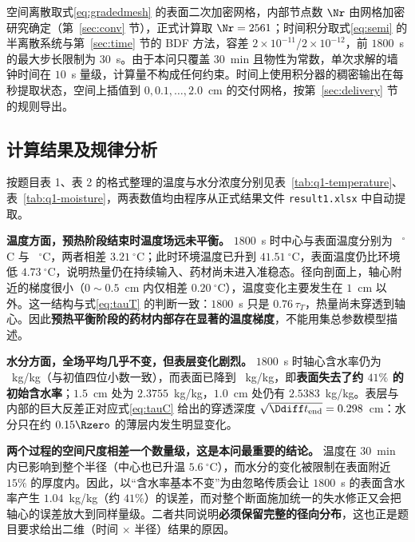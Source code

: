 空间离散取式\eqref{eq:gradedmesh} 的表面二次加密网格，内部节点数 $\Nr$ 由网格加密研究确定（第~\ref{sec:conv} 节），正式计算取 $\Nr=2561$；时间积分取式\eqref{eq:semi} 的半离散系统与第~\ref{sec:time} 节的 BDF 方法，容差 $2\times10^{-11}$/$2\times10^{-12}$，前 $1800$~s 的最大步长限制为 $30$~s。由于本问只覆盖 $30$~min 且物性为常数，单次求解的墙钟时间在 $10$~s 量级，计算量不构成任何约束。时间上使用积分器的稠密输出在每秒提取状态，空间上插值到 $0,0.1,\ldots,2.0$~cm 的交付网格，按第~\ref{sec:delivery} 节的规则导出。

\subsection{计算结果及规律分析}

按题目表 1、表 2 的格式整理的温度与水分浓度分别见表~\ref{tab:q1-temperature}、表~\ref{tab:q1-moisture}，两表数值均由程序从正式结果文件 \texttt{result1.xlsx} 中自动提取。


\textbf{温度方面，预热阶段结束时温度场远未平衡。} $1800$~s 时中心与表面温度分别为 \QOneCenterT~$^\circ$C 与 \QOneSurfaceT~$^\circ$C，两者相差 $3.21~^\circ$C；此时环境温度已升到 $41.51~^\circ$C，表面温度仍比环境低 $4.73~^\circ$C，说明热量仍在持续输入、药材尚未进入准稳态。径向剖面上，轴心附近的梯度很小（$0\sim0.5$~cm 内仅相差 $0.20~^\circ$C），温度变化主要发生在 $1$~cm 以外。这一结构与式\eqref{eq:tauT} 的判断一致：$1800$~s 只是 $0.76\,\tau_T$，热量尚未穿透到轴心。因此\textbf{预热平衡阶段的药材内部存在显著的温度梯度}，不能用集总参数模型描述。

\textbf{水分方面，全场平均几乎不变，但表层变化剧烈。} $1800$~s 时轴心含水率仍为 \QOneCenterC~kg/kg（与初值四位小数一致），而表面已降到 \QOneSurfaceC~kg/kg，即\textbf{表面失去了约 $41\%$ 的初始含水率}；$1.5$~cm 处为 $2.3755$~kg/kg，$1.0$~cm 处仍有 $2.5383$~kg/kg。表层与内部的巨大反差正对应式\eqref{eq:tauC} 给出的穿透深度 $\sqrt{\Ddiff t_{\mathrm{end}}}=0.298$~cm：水分只在约 $0.15\Rzero$ 的薄层内发生明显变化。

\textbf{两个过程的空间尺度相差一个数量级，这是本问最重要的结论。} 温度在 $30$~min 内已影响到整个半径（中心也已升温 $5.6~^\circ$C），而水分的变化被限制在表面附近 $15\%$ 的厚度内。因此，以``含水率基本不变''为由忽略传质会让 $1800$~s 的表面含水率产生 $1.04$~kg/kg（约 $41\%$）的误差，而对整个断面施加统一的失水修正又会把轴心的误差放大到同样量级。二者共同说明\textbf{必须保留完整的径向分布}，这也正是题目要求给出二维（时间 $\times$ 半径）结果的原因。

